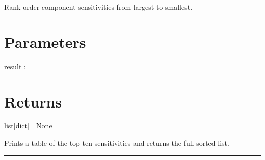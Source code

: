 \documentclass[letterpaper,10pt,english]{sphinxmanual}
\begin{document}
\begin{fulllineitems}
\label{\detokenize{fault_analysis:rank_component_sensitivities}}
\pysigstartsignatures
\pysiglinewithargsret
{}
{}
{}
\pysigstopsignatures
\sphinxAtStartPar
Rank order component sensitivities from largest to smallest.


\section{Parameters}
\label{\detokenize{fault_analysis:parameters}}
\sphinxAtStartPar
result : {\hyperref[\detokenize{results:SimulationResult}]{}}


\section{Returns}
\label{\detokenize{fault_analysis:returns}}
\sphinxAtStartPar
list{[}dict{]} | None

\sphinxAtStartPar
Prints a table of the top ten sensitivities and returns the full sorted list.

\end{fulllineitems}



\bigskip\hrule\bigskip

\end{document}

